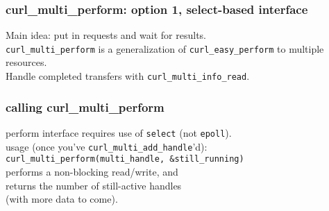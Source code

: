 \documentclass[aspectratio=43]{beamer}
\newenvironment{changemargin}[1]{%
  \begin{list}{}{%
    \setlength{\topsep}{0pt}%
    \setlength{\leftmargin}{#1}%
    \setlength{\rightmargin}{1em}
    \setlength{\listparindent}{\parindent}%
    \setlength{\itemindent}{\parindent}%
    \setlength{\parsep}{\parskip}%
  }%
  \item[]}{\end{list}}
\begin{document}
\begin{frame}
  \frametitle{curl\_multi\_perform: option 1, select-based interface}

  \begin{changemargin}{1.5cm}
    Main idea: put in requests and wait for results.\\[1em]

    {\tt curl\_multi\_perform} is a generalization of {\tt curl\_easy\_perform} to multiple resources.\\[1em]

    Handle completed transfers with {\tt curl\_multi\_info\_read}.

  \end{changemargin}

\end{frame}

\begin{frame}
  \frametitle{calling curl\_multi\_perform}

  \begin{changemargin}{2cm}
    perform interface requires use of {\tt select} (not {\tt epoll}).\\[1em]

    usage (once you've {\tt curl\_multi\_add\_handle}'d):\\[.5em]
    \hspace*{-2em} {\tt curl\_multi\_perform(multi\_handle, \&still\_running)}\\[.5em]
    performs a non-blocking read/write, and\\
    returns the number of still-active handles\\ \hspace*{2em} (with more data to come).

  \end{changemargin}

\end{frame}
\end{document}
